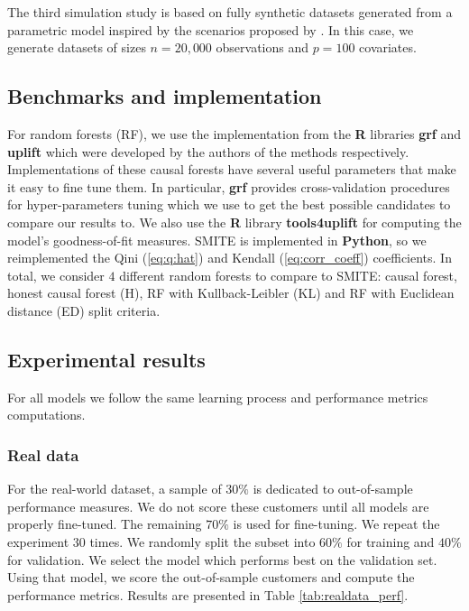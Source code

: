 \documentclass{article}
\begin{document}
The third simulation study is based on fully synthetic datasets generated from a parametric model inspired by the scenarios proposed by \cite{tian2014simple}. In this case, we generate datasets of sizes $n=20,000$ observations and $p=100$ covariates.


\subsection{Benchmarks and implementation}

For random forests (RF), we use the implementation from the \textbf{R} libraries \textbf{grf}  \citep{tibshirani2019R_grf}  and \textbf{uplift} \citep{guelman2014R_uplift} which were developed by the authors of the methods respectively. Implementations of these causal forests have several useful parameters that make it easy to fine tune them. In particular, \textbf{grf} provides cross-validation procedures for hyper-parameters tuning which we use to get the best possible candidates to compare our results to. We also use the \textbf{R} library \textbf{tools4uplift} \citep{belba2020R_tools4uplift} for computing the model's goodness-of-fit measures. SMITE is implemented in \textbf{Python}, so we reimplemented the Qini (\ref{eq:q:hat}) and Kendall (\ref{eq:corr_coeff}) coefficients. In total, we consider $4$ different random forests to compare to SMITE: causal forest, honest causal forest (H), RF with Kullback-Leibler (KL) and RF with Euclidean distance (ED) split criteria. 

\subsection{Experimental results}

For all models we follow the same learning process and performance metrics computations.

\subsubsection{Real data}

For the real-world dataset, a sample of $30\%$ is dedicated to out-of-sample performance measures. We do not score these customers until all models are properly fine-tuned. The remaining $70\%$ is used for fine-tuning. We repeat the experiment $30$ times. We randomly split the subset into $60\%$ for training and $40\%$ for validation. We select the model which performs best on the validation set. Using that model, we score the out-of-sample customers and compute the performance metrics. Results are presented in Table \ref{tab:realdata_perf}.
\end{document}
